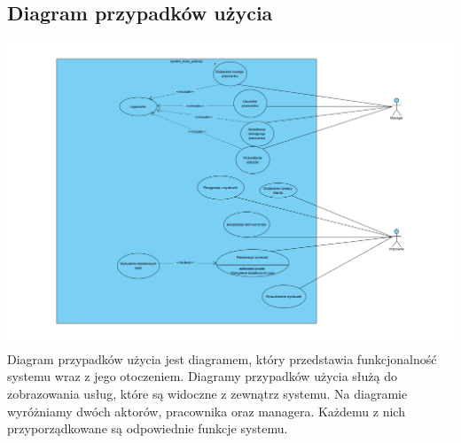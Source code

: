 \documentclass[polish,polish,a4paper]{article}
\begin{document}
\subsection{Diagram przypadków użycia}
\includegraphics[width=20cm]{use_case.PNG}
Diagram przypadków użycia jest diagramem, który przedstawia funkcjonalność systemu wraz z jego otoczeniem. Diagramy przypadków użycia służą do zobrazowania usług, które są widoczne z zewnątrz systemu. Na diagramie wyróżniamy dwóch aktorów, pracownika oraz managera. Każdemu z nich przyporządkowane są odpowiednie funkcje systemu.
\end{document}
